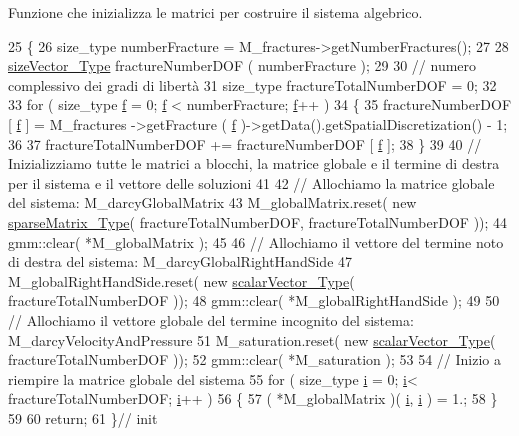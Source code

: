 Funzione che inizializza le matrici per costruire il sistema algebrico. 


\begin{DoxyCode}
25 \{
26     size\_type numberFracture = M\_fractures->getNumberFractures();
27 
28     \hyperlink{Core_8h_a83c51913d041a5001e8683434c09857f}{sizeVector\_Type} fractureNumberDOF ( numberFracture );
29 
30     \textcolor{comment}{// numero complessivo dei gradi di libertà}
31     size\_type fractureTotalNumberDOF = 0;
32 
33     \textcolor{keywordflow}{for} ( size\_type \hyperlink{god__e_8m_a68f477f9b30a6300d5af9b02eac82f35}{f} = 0; \hyperlink{god__e_8m_a68f477f9b30a6300d5af9b02eac82f35}{f} < numberFracture; \hyperlink{god__e_8m_a68f477f9b30a6300d5af9b02eac82f35}{f}++ )
34     \{
35         fractureNumberDOF [ \hyperlink{god__e_8m_a68f477f9b30a6300d5af9b02eac82f35}{f} ] = M\_fractures ->getFracture ( \hyperlink{god__e_8m_a68f477f9b30a6300d5af9b02eac82f35}{f} )->getData().getSpatialDiscretization() -
       1;
36 
37         fractureTotalNumberDOF += fractureNumberDOF [ \hyperlink{god__e_8m_a68f477f9b30a6300d5af9b02eac82f35}{f} ];
38     \}
39 
40     \textcolor{comment}{// Inizializziamo tutte le matrici a blocchi, la matrice globale e il termine di destra per il sistema
       e il vettore delle soluzioni}
41 
42     \textcolor{comment}{// Allochiamo la matrice globale del sistema:  M\_darcyGlobalMatrix}
43     M\_globalMatrix.reset( \textcolor{keyword}{new} \hyperlink{Core_8h_afba9f623673e2ae32054015bdb5500f9}{sparseMatrix\_Type}( fractureTotalNumberDOF, 
      fractureTotalNumberDOF ));
44     gmm::clear( *M\_globalMatrix );
45 
46     \textcolor{comment}{// Allochiamo il vettore del termine noto di destra del sistema: M\_darcyGlobalRightHandSide}
47     M\_globalRightHandSide.reset( \textcolor{keyword}{new} \hyperlink{Core_8h_a4e75b5863535ba1dd79942de2846eff0}{scalarVector\_Type}( fractureTotalNumberDOF ));
48     gmm::clear( *M\_globalRightHandSide );
49 
50     \textcolor{comment}{// Allochiamo il vettore globale del termine incognito del sistema: M\_darcyVelocityAndPressure}
51     M\_saturation.reset( \textcolor{keyword}{new} \hyperlink{Core_8h_a4e75b5863535ba1dd79942de2846eff0}{scalarVector\_Type}( fractureTotalNumberDOF ));
52     gmm::clear( *M\_saturation );
53 
54     \textcolor{comment}{// Inizio a riempire la matrice globale del sistema}
55     \textcolor{keywordflow}{for} ( size\_type \hyperlink{god__e_8m_a8604be5925f4266ab5ccc69675329c80}{i} = 0; \hyperlink{god__e_8m_a8604be5925f4266ab5ccc69675329c80}{i}< fractureTotalNumberDOF; \hyperlink{god__e_8m_a8604be5925f4266ab5ccc69675329c80}{i}++ )
56     \{
57         ( *M\_globalMatrix )( \hyperlink{god__e_8m_a8604be5925f4266ab5ccc69675329c80}{i}, \hyperlink{god__e_8m_a8604be5925f4266ab5ccc69675329c80}{i} ) = 1.;
58     \}
59 
60     \textcolor{keywordflow}{return};
61 \}\textcolor{comment}{// init}
\end{DoxyCode}


